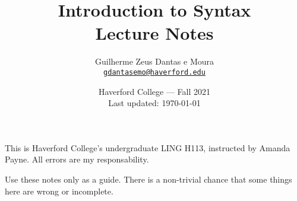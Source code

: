 \documentclass{scrbook}
\title{Introduction to Syntax\\Lecture Notes}
\author{Guilherme Zeus Dantas e Moura\\\href{mailto:gdantasemo@haverford.edu}{\texttt{gdantasemo@haverford.edu}}}
\date{Haverford College --- Fall 2021\\Last updated: \today}
\begin{document}
	\maketitle

		This is Haverford College's undergraduate LING H113, instructed by Amanda Payne.
		All errors are my responsability.

		Use these notes only as a guide. There is a non-trivial chance that some things here are wrong or incomplete.
	

		\tableofcontents
		\newpage

	
\end{document}
